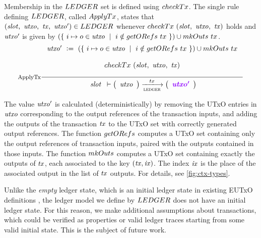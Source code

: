 Membership in the $\LEDGER$ set is defined using $\fun{checkTx}$.
The single rule defining $\LEDGER$, called $\fun{ApplyTx}$, states that
$(\var{slot},~\var{utxo},~\var{tx},~\var{utxo'}) \in \mathsf{LEDGER}$
whenever $\fun{checkTx}~(\var{slot},~\var{utxo},~\var{tx})$ holds and $\mathit{utxo'}$
is given by $(\{~i\mapsto o \in \var{utxo} ~\mid~ i \notin \fun{getORefs}~{tx}~\}) \cup \fun{mkOuts}~{tx} $.
  \begin{equation}
  \label{fig:ledger-rule}
    \inference[ApplyTx]
    {
    \var{utxo'}~\leteq~(\{~i\mapsto o \in \var{utxo} ~\mid~ i \notin \fun{getORefs}~{tx}~\}) \cup \fun{mkOuts}~{tx}
    \\ ~ \\
    \fun{checkTx}~(\var{slot},~\var{utxo},~\var{tx})
    \\ ~ \\
    }
    {
    \begin{array}{l}
      \var{slot}\\
    \end{array}
      \vdash
      \left(
      \begin{array}{r}
        \var{utxo} \\
      \end{array}
      \right)
      \trans{ledger}{tx}
      \left(
      \begin{array}{r}
        \varUpdate{\var{utxo'}}  \\
      \end{array}
      \right) \\
    }
  \end{equation}

The value $\mathit{utxo'}$ is calculated (deterministically) by removing the UTxO entries in $\mathit{utxo}$
corresponding to the output references of the transaction inputs, and adding the outputs of the
transaction $\mathit{tx}$ to the UTxO set with correctly generated output references.
The function $\fun{getORefs}$ computes a UTxO set containing only the output
references of transaction inputs, paired with the outputs contained in those inputs.
The function $\fun{mkOuts}$ computes a UTxO set containing exactly the outputs of
$\mathit{tx}$, each associated to the key $(\mathit{tx}, \mathit{ix})$. The index
$\mathit{ix}$ is the place of the associated output in the list of $\mathit{tx}$ outputs.
For details, see \ref{fig:ctx-types}.

Unlike the \emph{empty} ledger state, which is an initial ledger state in existing
EUTxO definitions \cite{eutxoma}, the ledger model we define by
$\LEDGER$ does not have an initial ledger state. For this reason, we
make additional assumptions about transactions, which could
be verified as properties or valid ledger traces starting from some valid initial state.
This is the subject of future work.
